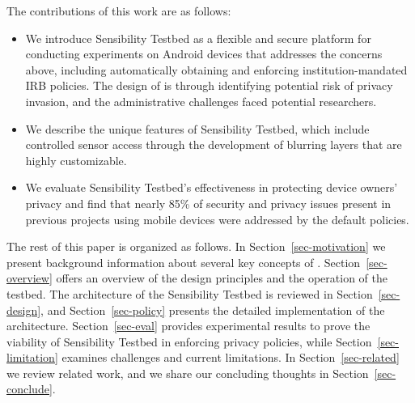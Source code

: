 The contributions of this work are as follows:

\begin{itemize}\setlength\itemsep{0em}

\item We introduce Sensibility Testbed as a flexible and secure platform for
conducting experiments on Android devices that addresses the
concerns above, including automatically obtaining and enforcing 
institution-mandated IRB policies. The design of \sysname is through 
identifying potential risk of privacy invasion, and the administrative 
challenges faced potential researchers.

\item We describe the unique features of Sensibility Testbed, which include 
controlled sensor access through the development of blurring layers that are
highly customizable.

\item We evaluate Sensibility Testbed's effectiveness in
protecting device owners' privacy and find that nearly 85\% of
security and privacy issues present in previous projects using 
mobile devices were addressed by the default policies.
\end{itemize}

The rest of this paper is organized as follows. In Section~\ref{sec-motivation} we
present background information about several key concepts of \sysname. 
Section~\ref{sec-overview} offers an overview of the design principles 
and the operation of the testbed. The architecture of the Sensibility Testbed 
is reviewed in Section~\ref{sec-design}, and Section~\ref{sec-policy} 
presents the detailed implementation of the architecture. 
Section~\ref{sec-eval} provides experimental results to prove the
viability of Sensibility Testbed in enforcing privacy policies, while
Section~\ref{sec-limitation} examines challenges and current limitations. 
In Section~\ref{sec-related} we review related work,
and we share our concluding thoughts in Section~\ref{sec-conclude}.

